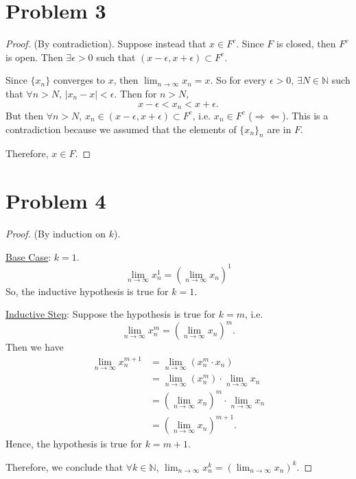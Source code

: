 \documentclass{article}
\begin{document}
\section*{Problem 3}
\begin{proof}
	(By contradiction). Suppose instead that $x \in F^c$. Since $F$ is closed, then $F^c$ is open. Then $\exists \epsilon > 0$ such that $(x-\epsilon, x+\epsilon) \subset F^c$. 
	
	Since $\{x_n\}$ converges to $x$, then $\lim_{n\to\infty}x_n = x$. So for every $\epsilon > 0$, $\exists N \in \mathbb{N}$ such that $\forall n > N$, $|x_n-x|<\epsilon$. Then for $n>N$, 
	\begin{equation}
		x-\epsilon < x_n<x+\epsilon.
	\end{equation}
	But then $\forall n > N$, $x_n \in (x-\epsilon, x+\epsilon)\subset F^c$, i.e. $x_n \in F^c$ ($\Rightarrow\Leftarrow$). This is a contradiction because we assumed that the elements of $\{x_n\}_n$ are in $F$. 
	
	Therefore, $x \in F$.
\end{proof}
\section*{Problem 4}
\begin{proof}
	(By induction on $k$). 

	\underline{Base Case}: $k=1$. 
	\begin{equation}
		\lim_{n\to\infty}x_n^1 = \left(\lim_{n\to\infty} x_n\right)^1
	\end{equation}
	So, the inductive hypothesis is true for $k=1$.
	
	\underline{Inductive Step}: Suppose the hypothesis is true for $k=m$, i.e.
	\begin{equation}
		\lim_{n\to\infty}x_n^m = \left(\lim_{n\to\infty}x_n\right)^m.
	\end{equation}
	Then we have
	\begin{align}
		\lim_{n\to\infty}x_n^{m+1} &= \lim_{n\to\infty}\left(x_n^m \cdot x_n\right) \\
		&= \lim_{n\to\infty}\left(x_n^m\right) \cdot \lim_{n\to\infty}x_n \\
		&= \left(\lim_{n\to\infty}x_n\right)^m \cdot \lim_{n\to\infty}x_n \\
		&= \left(\lim_{n\to\infty}x_n\right)^{m+1}.
	\end{align}
	Hence, the hypothesis is true for $k=m+1$.
	
	Therefore, we conclude that $\forall k \in \mathbb{N}$, $\lim_{n\to\infty}x_n^k = \left(\lim_{n\to\infty}x_n\right)^k$.
\end{proof}
\end{document}

